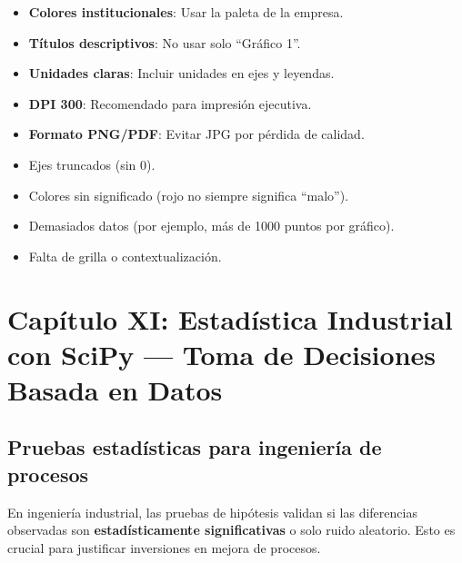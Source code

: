 \documentclass[11pt, a4paper]{article}
\begin{document}
\begin{conceptbox}
\begin{itemize}
    \item \textbf{Colores institucionales}: Usar la paleta de la empresa.
    \item \textbf{Títulos descriptivos}: No usar solo ``Gráfico 1''.
    \item \textbf{Unidades claras}: Incluir unidades en ejes y leyendas.
    \item \textbf{DPI 300}: Recomendado para impresión ejecutiva.
    \item \textbf{Formato PNG/PDF}: Evitar JPG por pérdida de calidad.
\end{itemize}
\end{conceptbox}

\begin{warningbox}
\begin{itemize}
    \item Ejes truncados (sin 0).
    \item Colores sin significado (rojo no siempre significa ``malo'').
    \item Demasiados datos (por ejemplo, más de 1000 puntos por gráfico).
    \item Falta de grilla o contextualización.
\end{itemize}
\end{warningbox}

\newpage
\section{Capítulo XI: Estadística Industrial con SciPy --- Toma de Decisiones Basada en Datos}

\subsection{Pruebas estadísticas para ingeniería de procesos}

En ingeniería industrial, las pruebas de hipótesis validan si las diferencias observadas son \textbf{estadísticamente significativas} o solo ruido aleatorio. Esto es crucial para justificar inversiones en mejora de procesos.
\end{document}
